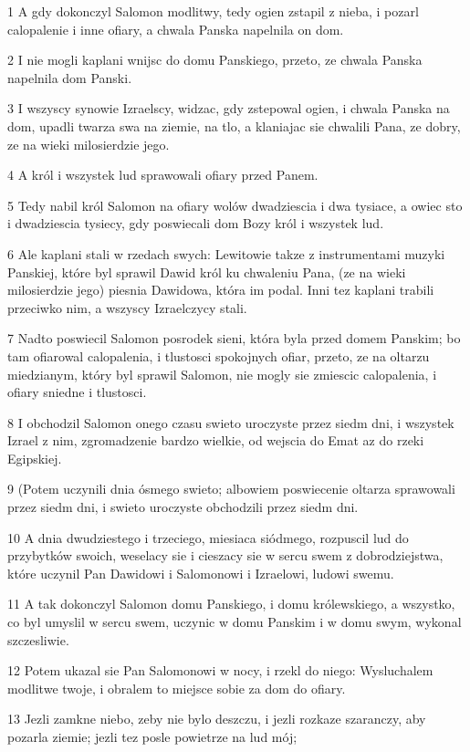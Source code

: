 \par 1 A gdy dokonczyl Salomon modlitwy, tedy ogien zstapil z nieba, i pozarl calopalenie i inne ofiary, a chwala Panska napelnila on dom.
\par 2 I nie mogli kaplani wnijsc do domu Panskiego, przeto, ze chwala Panska napelnila dom Panski.
\par 3 I wszyscy synowie Izraelscy, widzac, gdy zstepowal ogien, i chwala Panska na dom, upadli twarza swa na ziemie, na tlo, a klaniajac sie chwalili Pana, ze dobry, ze na wieki milosierdzie jego.
\par 4 A król i wszystek lud sprawowali ofiary przed Panem.
\par 5 Tedy nabil król Salomon na ofiary wolów dwadziescia i dwa tysiace, a owiec sto i dwadziescia tysiecy, gdy poswiecali dom Bozy król i wszystek lud.
\par 6 Ale kaplani stali w rzedach swych: Lewitowie takze z instrumentami muzyki Panskiej, które byl sprawil Dawid król ku chwaleniu Pana, (ze na wieki milosierdzie jego) piesnia Dawidowa, która im podal. Inni tez kaplani trabili przeciwko nim, a wszyscy Izraelczycy stali.
\par 7 Nadto poswiecil Salomon posrodek sieni, która byla przed domem Panskim; bo tam ofiarowal calopalenia, i tlustosci spokojnych ofiar, przeto, ze na oltarzu miedzianym, który byl sprawil Salomon, nie mogly sie zmiescic calopalenia, i ofiary sniedne i tlustosci.
\par 8 I obchodzil Salomon onego czasu swieto uroczyste przez siedm dni, i wszystek Izrael z nim, zgromadzenie bardzo wielkie, od wejscia do Emat az do rzeki Egipskiej.
\par 9 (Potem uczynili dnia ósmego swieto; albowiem poswiecenie oltarza sprawowali przez siedm dni, i swieto uroczyste obchodzili przez siedm dni.
\par 10 A dnia dwudziestego i trzeciego, miesiaca siódmego, rozpuscil lud do przybytków swoich, weselacy sie i cieszacy sie w sercu swem z dobrodziejstwa, które uczynil Pan Dawidowi i Salomonowi i Izraelowi, ludowi swemu.
\par 11 A tak dokonczyl Salomon domu Panskiego, i domu królewskiego, a wszystko, co byl umyslil w sercu swem, uczynic w domu Panskim i w domu swym, wykonal szczesliwie.
\par 12 Potem ukazal sie Pan Salomonowi w nocy, i rzekl do niego: Wysluchalem modlitwe twoje, i obralem to miejsce sobie za dom do ofiary.
\par 13 Jezli zamkne niebo, zeby nie bylo deszczu, i jezli rozkaze szaranczy, aby pozarla ziemie; jezli tez posle powietrze na lud mój;
